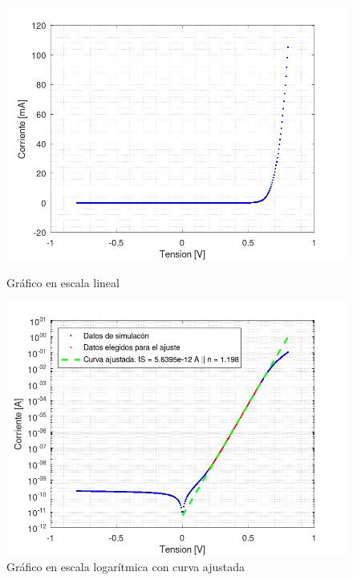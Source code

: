 \documentclass[10pt]{article}
\begin{document}
\begin{figure}[ht!]
\begin{minipage}{.5\textwidth}
\centering
\includegraphics[width=1.1\linewidth]{resources/grafico_escala_lineal.png}
\caption{Gráfico en escala lineal}
\label{fig:grafico_escala_lineal}
\end{minipage}
\begin{minipage}{.5\textwidth}
\centering
\includegraphics[width=1.1\linewidth]{resources/grafico_escala_logaritmica.png}
\caption{Gráfico en escala logarítmica con curva ajustada}
\label{fig:grafico_escala_logaritmica}
\end{minipage}
\end{figure}
\end{document}
